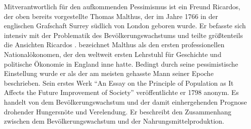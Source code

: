 Mitverantwortlich f{\"u}r den aufkommenden Pessimismus ist ein Freund Ricardos, der oben bereits vorgestellte Thomas Malthus, der im Jahre 1766 in der englischen Grafschaft Surrey s{\"u}dlich von London geboren wurde. Er befasste sich intensiv mit der Problematik des Bev{\"o}lkerungswachstums und teilte gr{\"o}{\ss}tenteils die Ansichten Ricardos .\newline
\citet{Lin.2007} bezeichnet Malthus als den ersten professionellen National{\"o}konomen, der den weltweit ersten Lehrstuhl f{\"u}r Geschichte und politische {\"O}konomie in England inne hatte. Bedingt durch seine pessimistische Einstellung wurde er als der am meisten gehasste Mann seiner Epoche beschrieben. \newline Sein erstes Werk "`An Essay on the Principle of Population as It Affects the Future Improvement of Society"' ver{\"o}ffentlichte er 1798 anonym. Es handelt von dem Bev{\"o}lkerungswachstum und der damit einhergehenden Prognose drohender Hungersn{\"o}te und Verelendung. Er beschreibt den Zusammenhang zwischen dem Bev{\"o}lkerungswachstum und der Nahrungsmittelproduktion.\\

